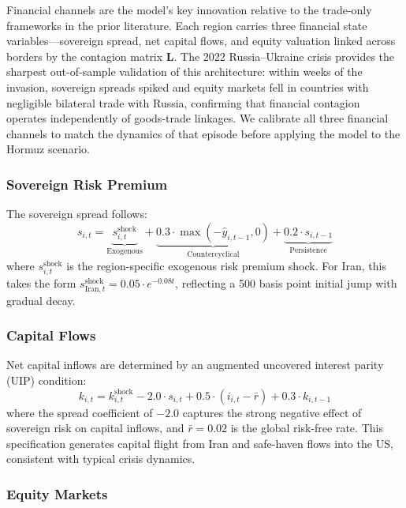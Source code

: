 \documentclass[12pt]{article}
\begin{document}
Financial channels are the model's key innovation relative to the trade-only frameworks in the prior literature. Each region carries three financial state variables---sovereign spread, net capital flows, and equity valuation linked across borders by the contagion matrix $\mathbf{L}$. The 2022 Russia--Ukraine crisis provides the sharpest out-of-sample validation of this architecture: within weeks of the invasion, sovereign spreads spiked and equity markets fell in countries with negligible bilateral trade with Russia, confirming that financial contagion operates independently of goods-trade linkages. We calibrate all three financial channels to match the dynamics of that episode before applying the model to the Hormuz scenario.

\subsubsection{Sovereign Risk Premium}

The sovereign spread follows:
\begin{equation}
s_{i,t} = \underbrace{s^{\text{shock}}_{i,t}}_{\text{Exogenous}} + \underbrace{0.3 \cdot \max(-\hat{y}_{i,t-1}, 0)}_{\text{Countercyclical}} + \underbrace{0.2 \cdot s_{i,t-1}}_{\text{Persistence}}
\label{eq:spread}
\end{equation}
where $s^{\text{shock}}_{i,t}$ is the region-specific exogenous risk premium shock. For Iran, this takes the form $s^{\text{shock}}_{\text{Iran},t} = 0.05 \cdot e^{-0.08t}$, reflecting a 500 basis point initial jump with gradual decay.

\subsubsection{Capital Flows}

Net capital inflows are determined by an augmented uncovered interest parity (UIP) condition:
\begin{equation}
k_{i,t} = k^{\text{shock}}_{i,t} - 2.0 \cdot s_{i,t} + 0.5 \cdot (i_{i,t} - \bar{r}) + 0.3 \cdot k_{i,t-1}
\label{eq:capital}
\end{equation}
where the spread coefficient of $-2.0$ captures the strong negative effect of sovereign risk on capital inflows, and $\bar{r} = 0.02$ is the global risk-free rate. This specification generates capital flight from Iran and safe-haven flows into the US, consistent with typical crisis dynamics.

\subsubsection{Equity Markets}
\end{document}
